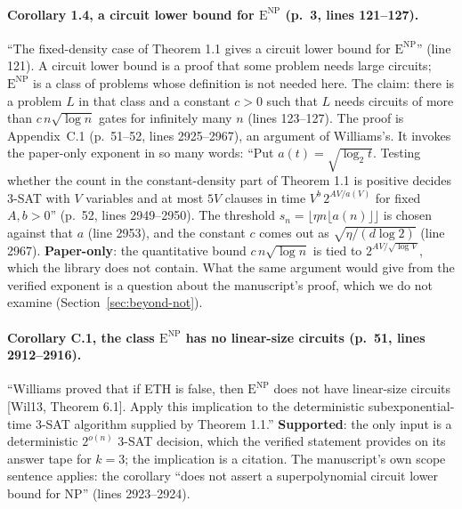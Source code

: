 \paragraph{Corollary 1.4, a circuit lower bound for $\mathrm{E}^{\mathrm{NP}}$ (p.~3, lines 121--127).}
``The fixed-density case of Theorem 1.1 gives a circuit lower bound for
$\mathrm{E}^{\mathrm{NP}}$'' (line 121). A circuit lower bound is a proof that some problem needs large circuits; $\mathrm{E}^{\mathrm{NP}}$ is a class of problems whose definition is not needed here. The claim: there is a problem $L$ in that class and a constant $c > 0$ such that $L$ needs circuits of more than $c\,n\sqrt{\log n}$ gates for infinitely many $n$ (lines 123--127). The proof is Appendix~C.1 (p.~51--52, lines 2925--2967), an argument of
Williams's. It invokes the paper-only exponent in so many words: ``Put
$a(t) = \sqrt{\log_2 t}$. Testing whether the count in the
constant-density part of Theorem 1.1 is positive decides 3-SAT with $V$
variables and at most $5V$ clauses in time $V^b\,2^{AV/a(V)}$ for fixed
$A, b > 0$'' (p.~52, lines 2949--2950). The threshold
$s_n = \lfloor\eta n\lfloor a(n)\rfloor\rfloor$ is chosen against that
$a$ (line 2953), and the constant $c$ comes out as
$\sqrt{\eta/(d\log 2)}$ (line 2967). \textbf{Paper-only}: the
quantitative bound $c\,n\sqrt{\log n}$ is tied to $2^{AV/\sqrt{\log V}}$,
which the library does not contain. What the same argument would give
from the verified exponent is a question about the manuscript's proof,
which we do not examine (Section~\ref{sec:beyond-not}).

\paragraph{Corollary C.1, the class $\mathrm{E}^{\mathrm{NP}}$ has no linear-size circuits (p.~51, lines 2912--2916).}
``Williams proved that if ETH is false, then $\mathrm{E}^{\mathrm{NP}}$
does not have linear-size circuits [Wil13, Theorem 6.1]. Apply this
implication to the deterministic subexponential-time 3-SAT algorithm
supplied by Theorem 1.1.'' \textbf{Supported}: the only input is a
deterministic $2^{o(n)}$ 3-SAT decision, which the verified statement
provides on its answer tape for $k = 3$; the implication is a citation.
The manuscript's own scope sentence applies: the corollary ``does not
assert a superpolynomial circuit lower bound for NP'' (lines 2923--2924).

